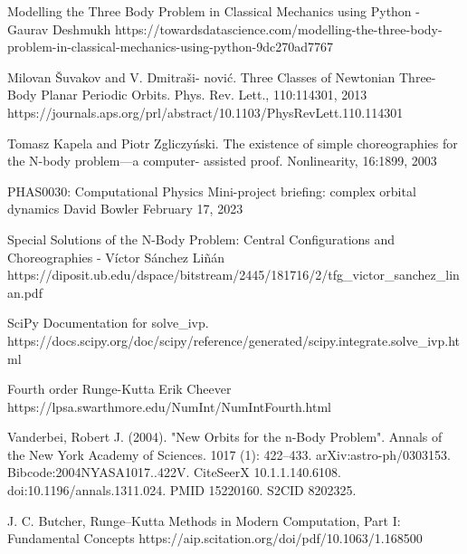 \documentclass[11pt]{article}
\begin{document}
\begin{thebibliography}{9}

Modelling the Three Body Problem in Classical Mechanics using Python - Gaurav Deshmukh
https://towardsdatascience.com/modelling-the-three-body-problem-in-classical-mechanics-using-python-9dc270ad7767



Milovan \v{S}uvakov and V. Dmitra\v{s}i- novi\'{c}. Three Classes of Newtonian Three-Body Planar Periodic Orbits. Phys. Rev. Lett., 110:114301, 2013
https://journals.aps.org/prl/abstract/10.1103/PhysRevLett.110.114301

Tomasz Kapela and Piotr Zgliczy\'{n}ski. The existence of simple choreographies for the N-body problem—a computer- assisted proof. Nonlinearity, 16:1899, 2003

PHAS0030: Computational Physics Mini-project briefing: complex orbital dynamics David Bowler
February 17, 2023

Special Solutions of the N-Body Problem: Central Configurations and Choreographies - V\'{i}ctor S\'{a}nchez Li\~{n}\'{a}n
https://diposit.ub.edu/dspace/bitstream/2445/181716/2/tfg\_victor\_sanchez\_linan.pdf

SciPy Documentation for solve\_ivp.
https://docs.scipy.org/doc/scipy/reference/generated/scipy.integrate.solve\_ivp.html

Fourth order Runge-Kutta Erik Cheever
https://lpsa.swarthmore.edu/NumInt/NumIntFourth.html

Vanderbei, Robert J. (2004). "New Orbits for the n-Body Problem". Annals of the New York Academy of Sciences. 1017 (1): 422–433. arXiv:astro-ph/0303153. Bibcode:2004NYASA1017..422V. CiteSeerX 10.1.1.140.6108. doi:10.1196/annals.1311.024. PMID 15220160. S2CID 8202325.

J. C. Butcher, Runge–Kutta Methods in Modern Computation, Part I: Fundamental Concepts
https://aip.scitation.org/doi/pdf/10.1063/1.168500



\end{thebibliography}
\end{document}
